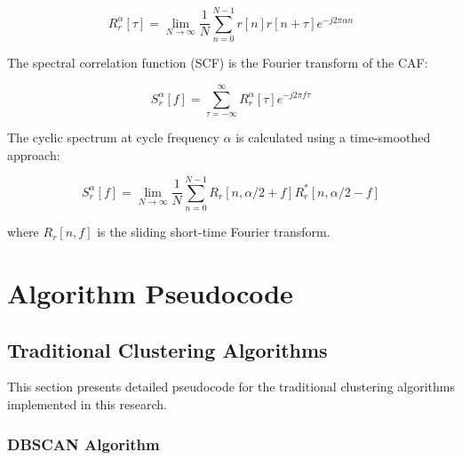\begin{equation}
    R_r^\alpha[\tau] = \lim_{N \to \infty} \frac{1}{N} \sum_{n=0}^{N-1} r[n]r[n+\tau]e^{-j2\pi\alpha n}
\end{equation}

The spectral correlation function (SCF) is the Fourier transform of the CAF:

\begin{equation}
    S_r^\alpha[f] = \sum_{\tau=-\infty}^{\infty} R_r^\alpha[\tau]e^{-j2\pi f\tau}
\end{equation}

The cyclic spectrum at cycle frequency $\alpha$ is calculated using a time-smoothed approach:

\begin{equation}
    S_r^\alpha[f] = \lim_{N \to \infty} \frac{1}{N} \sum_{n=0}^{N-1} R_r[n, \alpha/2 + f]R_r^*[n, \alpha/2 - f]
\end{equation}

where $R_r[n, f]$ is the sliding short-time Fourier transform.

\section{Algorithm Pseudocode}
\label{app:pseudocode}

\subsection{Traditional Clustering Algorithms}
\label{app:trad_pseudocode}

This section presents detailed pseudocode for the traditional clustering algorithms implemented in this research.

\subsubsection{DBSCAN Algorithm}


